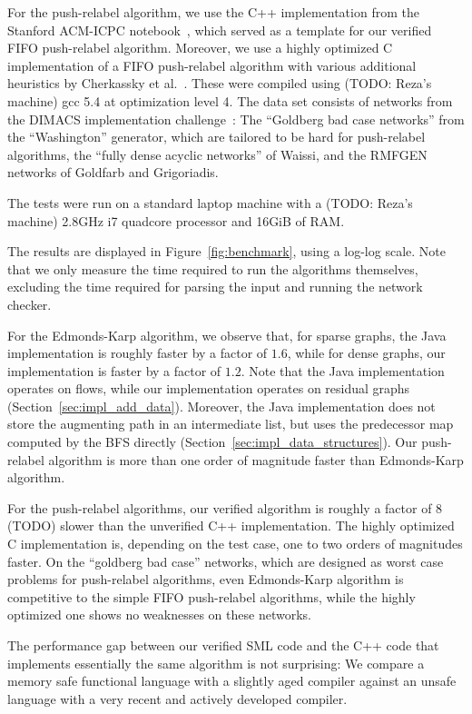 \documentclass[smallcondensed]{svjour3}     %
\begin{document}
  For the push-relabel algorithm, we use the C++ implementation from the Stanford ACM-ICPC notebook~\cite{ICPC-notebook}, which served as 
  a template for our verified FIFO push-relabel algorithm. Moreover, we use a highly optimized C implementation of a FIFO push-relabel 
  algorithm with various additional heuristics by Cherkassky et al.~\cite{ChGo97}. These were compiled using (TODO: Reza's machine) gcc 5.4 at optimization level 4.
  The data set consists of networks from the DIMACS implementation challenge~\cite{JGC93}: 
  The ``Goldberg bad case networks'' from the ``Washington'' generator, which are tailored to be hard for push-relabel algorithms, 
  the ``fully dense acyclic networks'' of Waissi, and the RMFGEN networks of Goldfarb and Grigoriadis. 
  
  The tests were run on a standard laptop machine with a (TODO: Reza's machine) 2.8GHz i7 quadcore processor and 16GiB of RAM.
  
  The results are displayed in Figure~\ref{fig:benchmark}, using a log-log scale.
  Note that we only measure the time required to run the algorithms themselves, excluding the time required for parsing the input and running the network checker.
  
  For the Edmonds-Karp algorithm, we observe that, for sparse graphs, the Java implementation is roughly faster by a factor of $1.6$, while for dense graphs, 
  our implementation is faster by a factor of $1.2$. Note that the Java implementation operates on flows, while our implementation 
  operates on residual graphs (\cf Section~\ref{sec:impl_add_data}). Moreover, the Java implementation does not store the augmenting 
  path in an intermediate list, but uses the predecessor map computed by the BFS directly (\cf Section~\ref{sec:impl_data_structures}).
  Our push-relabel algorithm is more than one order of magnitude faster than Edmonds-Karp algorithm.
  
  For the push-relabel algorithms, our verified algorithm is roughly a factor of 8 (TODO) slower than the unverified C++ implementation.
  The highly optimized C implementation is, depending on the test case, one to two orders of magnitudes faster. 
  On the ``goldberg bad case'' networks, which are designed as worst case problems for push-relabel algorithms, 
  even Edmonds-Karp algorithm is competitive to the simple FIFO push-relabel algorithms, while the highly optimized one shows no weaknesses on these networks.
  
  The performance gap between our verified SML code and the C++ code that implements essentially the same algorithm is not surprising: We compare a 
  memory safe functional language with a slightly aged compiler against an unsafe language with a very recent and actively developed compiler.
  
\end{document}
